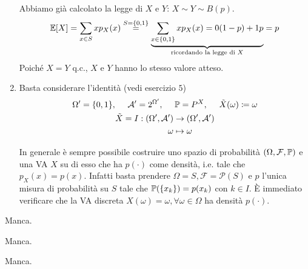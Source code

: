 \begin{enumerate}
Abbiamo già calcolato la legge di $X$ e $Y$: $X\sim Y\sim B(p)$.
\begin{equation*}
\mathbb{E}[X] =\sum\limits_{x\in S} xp_{X}(x)\overset{S=\{0,1\}}{=}\underbrace{\sum\limits_{x\in \{0,1\}} xp_{X}(x) =0(1-p) +1p}_{\text{ricordando la legge di } X} =p
\end{equation*}
Poiché $X=Y$ q.c., $X$ e $Y$ hanno lo stesso valore atteso.
\item Basta considerare l'identità (vedi esercizio $5$)
\begin{gather*}
\Omega '=\{0,1\} ,\ \ \ \ \Ac '=2^{\Omega '} ,\ \ \ \ \PP =P^{X} ,\ \ \ \ \tilde{X}(\omega) \coloneqq \omega \\
\begin{aligned}
\tilde{X} =I:(\Omega ',\Ac ') & \rightarrow (\Omega ',\Ac ')\\
\omega  & \mapsto \omega 
\end{aligned}
\end{gather*}

\begin{oss}
In generale è sempre possibile costruire uno spazio di probabilità $(\Omega ,\mathcal{F} ,\mathbb{P})$ e una VA $X$ su di esso che ha $p(\cdotp)$ come densità, i.e. tale che $p_{X}(x) =p(x)$. Infatti basta prendere $\Omega =S,\mathcal{F} =\mathcal{P}(S)$ e $p$ l'unica misura di probabilità su $S$ tale che $\mathbb{P}(\{x_{k}\}) =p(x_{k})$ con $k\in I$. È immediato verificare che la VA discreta $X(\omega) =\omega ,\forall \omega \in \Omega $ ha densità $p(\cdotp)$.
\end{oss}
\end{enumerate}

\Soluzione

Manca.

\Soluzione

Manca.

\Soluzione

Manca.

\Soluzione

